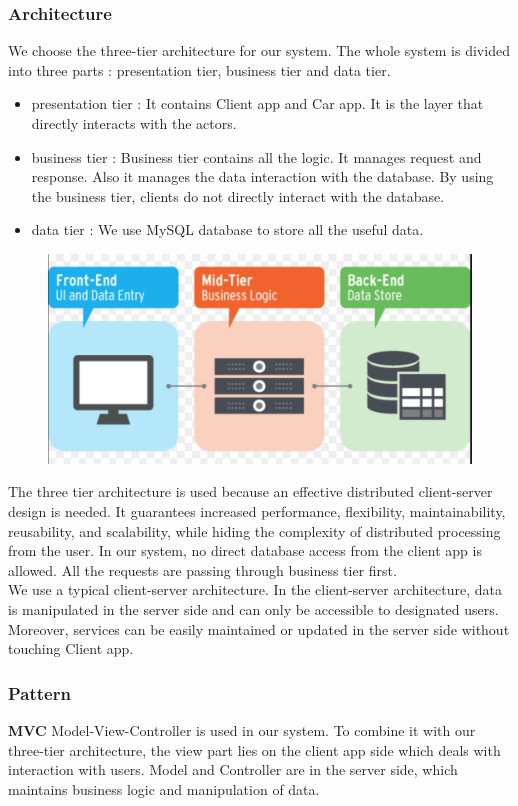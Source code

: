 \documentclass{article}
\begin{document}
	\subsubsection{Architecture}
	We choose the three-tier architecture for our system. The whole system is divided into three parts : presentation tier, business tier and data tier.
	\begin{itemize}
		\item presentation tier : It contains Client app and Car app. It is the layer that directly interacts with the actors. 
		\item business tier : Business tier contains all the logic. It manages request and response. Also it manages the data interaction with the database. By using the business tier, clients do not directly interact with the database. 
		\item data tier : We use MySQL database to store all the useful data.
	\end{itemize}
	\begin{figure}[h]
	\includegraphics[width=\textwidth]{architecture}
	\end{figure}
	The three tier architecture is used because an effective distributed client-server design is needed. It guarantees increased performance, flexibility, maintainability, reusability, and scalability, while hiding the complexity of distributed processing from the user. In our system, no direct database access from the client app is allowed. All the requests are passing through business tier first.
	\\
	We use a typical client-server architecture. In the client-server architecture, data is manipulated in the server side and can only be accessible to designated users. Moreover, services can be easily maintained or updated in the server side without touching Client app. 
	\subsubsection{Pattern}
	\textbf{MVC} Model-View-Controller is used in our system. To combine it with our three-tier architecture, the view part lies on the client app side which deals with interaction with users. Model and Controller are in the server side, which maintains business logic and manipulation of data. 
\end{document}
